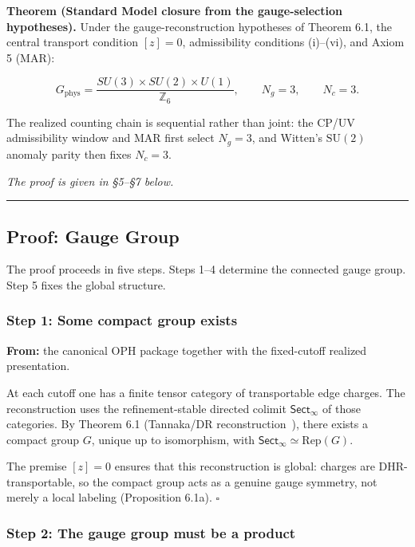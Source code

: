 \textbf{Theorem (Standard Model closure from the gauge-selection hypotheses).} Under the gauge-reconstruction hypotheses of Theorem 6.1, the central transport condition \([z]=0\), admissibility conditions (i)--(vi), and Axiom 5 (MAR):

\[G_{\mathrm{phys}} = \frac{SU(3) \times SU(2) \times U(1)}{\mathbb{Z}_6}, \qquad N_g = 3, \qquad N_c = 3.\]

The realized counting chain is sequential rather than joint: the CP/UV admissibility window and MAR first select \(N_g = 3\), and Witten's \(\mathrm{SU}(2)\) anomaly parity then fixes \(N_c = 3\).

\emph{The proof is given in \S{}5--\S{}7 below.}

\begin{center}\rule{0.5\linewidth}{0.5pt}\end{center}

\subsection{Proof: Gauge Group}\label{5-proof-gauge-group}

The proof proceeds in five steps. Steps 1--4 determine the connected gauge group. Step 5 fixes the global structure.

\subsubsection{Step 1: Some compact group exists}\label{step-1-some-compact-group-exists}

\textbf{From:} the canonical OPH package together with the fixed-cutoff realized presentation.

At each cutoff one has a finite tensor category of transportable edge charges. The reconstruction uses the refinement-stable directed colimit \(\mathsf{Sect}_\infty\) of those categories. By Theorem 6.1 (Tannaka/DR reconstruction~\cite{tannaka38,krein49,dr89,dr90}), there exists a compact group \(G\), unique up to isomorphism, with \(\mathsf{Sect}_\infty \simeq \mathrm{Rep}(G)\).

The premise \([z] = 0\) ensures that this reconstruction is global: charges are DHR-transportable, so the compact group acts as a genuine gauge symmetry, not merely a local labeling (Proposition 6.1a). \(\square\)

\subsubsection{Step 2: The gauge group must be a product}\label{step-2-the-gauge-group-must-be-a-product}

